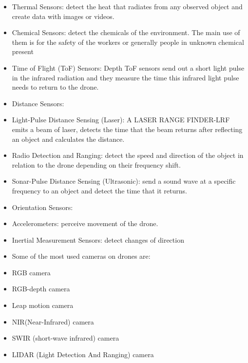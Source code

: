 \documentclass[12pt]{book}
\begin{document}
\begin{itemize}
    \item Thermal Sensors: detect the heat that radiates from any observed object and create data with images or videos. 

\item Chemical Sensors: detect the chemicals of the environment. The main use of them is for the safety of the workers or generally people in unknown chemical present 

\item Time of Flight (ToF) Sensors: Depth ToF sensors send out a short light pulse in the infrared radiation and they measure the time this infrared light pulse needs to return to the drone.

\item Distance Sensors: 

\item Light-Pulse Distance Sensing (Laser): A LASER RANGE FINDER-LRF emits a beam of laser, detects the time that the beam returns after reflecting an object and calculates the distance.

\item Radio Detection and Ranging: detect the speed and direction of the object in relation to the drone depending on their frequency shift. 

\item Sonar-Pulse Distance Sensing (Ultrasonic): send a sound wave at a specific frequency to an object and detect the time that it returns. 

\item Orientation Sensors: 

\item Accelerometers: perceive movement of the drone. 

\item Inertial Measurement Sensors: detect changes of direction 

\item Some of the most used cameras on drones are: 

\item RGB camera 

\item RGB-depth camera 

\item Leap motion camera 

\item NIR(Near-Infrared) camera 

\item SWIR (short-wave infrared) camera 

\item LIDAR (Light Detection And Ranging) camera 
\end{itemize}
\end{document}
